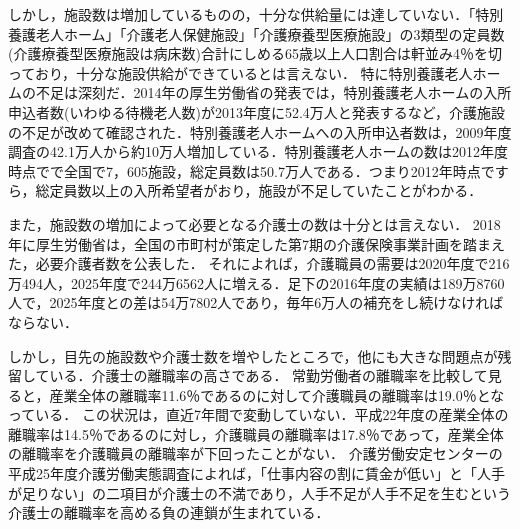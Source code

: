 しかし，施設数は増加しているものの，十分な供給量には達していない．「特別養護老人ホーム」「介護老人保健施設」「介護療養型医療施設」の3類型の定員数(介護療養型医療施設は病床数)合計にしめる65歳以上人口割合は軒並み4％を切っており，十分な施設供給ができているとは言えない．\cite{lack_facility_1}
特に特別養護老人ホームの不足は深刻だ．2014年の厚生労働省の発表では，特別養護老人ホームの入所申込者数(いわゆる待機老人数)が2013年度に52.4万人と発表するなど，介護施設の不足が改めて確認された．特別養護老人ホームへの入所申込者数は，2009年度調査の42.1万人から約10万人増加している．特別養護老人ホームの数は2012年度時点でで全国で7，605施設，総定員数は50.7万人である．つまり2012年時点ですら，総定員数以上の入所希望者がおり，施設が不足していたことがわかる．\cite{lack_facility_2}

また，施設数の増加によって必要となる介護士の数は十分とは言えない．
2018年に厚生労働省は，全国の市町村が策定した第7期の介護保険事業計画を踏まえた，必要介護者数を公表した．
それによれば，介護職員の需要は2020年度で216万494人，2025年度で244万6562人に増える．足下の2016年度の実績は189万8760人で，2025年度との差は54万7802人であり，毎年6万人の補充をし続けなければならない．

しかし，目先の施設数や介護士数を増やしたところで，他にも大きな問題点が残留している．介護士の離職率の高さである．
常勤労働者の離職率を比較して見ると，産業全体の離職率11.6％であるのに対して介護職員の離職率は19.0％となっている．
この状況は，直近7年間で変動していない．平成22年度の産業全体の離職率は14.5％であるのに対し，介護職員の離職率は17.8％であって，産業全体の離職率を介護職員の離職率が下回ったことがない．\cite{turnover_rate}
介護労働安定センターの平成25年度介護労働実態調査によれば，「仕事内容の割に賃金が低い」と「人手が足りない」の二項目が介護士の不満であり，人手不足が人手不足を生むという介護士の離職率を高める負の連鎖が生まれている．

